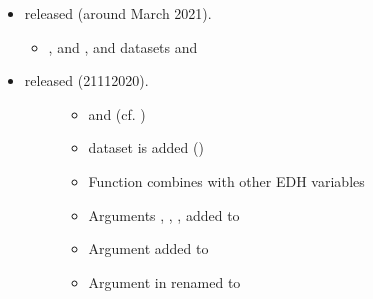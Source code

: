 \documentclass[a4paper,12pt,english]{sphinxhowto}
\begin{document}
\begin{itemize}
\item {} 
  released (around March 2021).
\begin{itemize}
\item {} 
 ,  and , and datasets  and 

\end{itemize}

\end{itemize}

\begin{itemize}
\item {} \begin{description}
\item[{  released (21\sphinxhyphen{}11\sphinxhyphen{}2020).}] \leavevmode\begin{itemize}
\item {} 
  and  (cf. )

\item {} 
 dataset is added ()

\end{itemize}
\begin{itemize}
\item {} 
Function  combines  with other EDH variables

\end{itemize}
\begin{itemize}
\item {} 
Arguments , , ,   added to 

\item {} 
Argument   added to 

\item {} 
Argument  in    renamed to 

\end{itemize}

\end{description}

\end{itemize}
\end{document}
